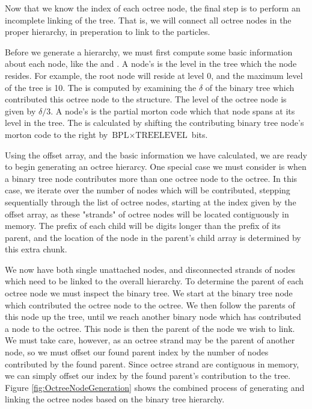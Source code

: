 \documentclass{thesis}
\begin{document}
Now that we know the index of each octree node, the final step is to perform an incomplete linking of the tree. That is, we will connect all octree nodes in the proper hierarchy, in preperation to link to the particles.

Before we generate a hierarchy, we must first compute some basic information about each node, like the  and . A node's  is the level in the tree which the node resides. For example, the root node will reside at level 0, and the maximum level of the tree is 10. The  is computed by examining the $\delta$ of the binary tree which contributed this octree node to the structure. The level of the octree node is given by $\delta/3$. A node's  is the partial morton code which that node spans at its level in the tree. The  is calculated by shifting the contributing binary tree node's morton code to the right by $\text{BPL} \times \text{TREELEVEL}$ bits.  

Using the offset array, and the basic information we have calculated, we are ready to begin generating an octree hierarcy. One special case we must consider is when a binary tree node contributes more than one octree node to the octree. In this case, we iterate over the number of nodes which will be contributed, stepping sequentially through the list of octree nodes, starting at the index given by the offset array, as these "strands" of octree nodes will be located contiguously in memory. The prefix of each child will be  digits longer than the prefix of its parent, and the location of the node in the parent's child array is determined by this extra chunk.

We now have both single unattached nodes, and disconnected strands of nodes which need to be linked to the overall hierarchy. To determine the parent of each octree node we must inspect the binary tree. We start at the binary tree node which contributed the octree node to the octree. We then follow the parents of this node up the tree, until we reach another binary node which has contributed a node to the octree. This node is then the parent of the node we wish to link. We must take care, however, as an octree strand may be the parent of another node, so we must offset our found parent index by the number of nodes contributed by the found parent. Since octree strand are contiguous in memory, we can simply offset our index by the found parent's contribution to the tree. Figure \ref{fig:OctreeNodeGeneration} shows the combined process of generating and linking the octree nodes based on the binary tree hierarchy.
\end{document}
